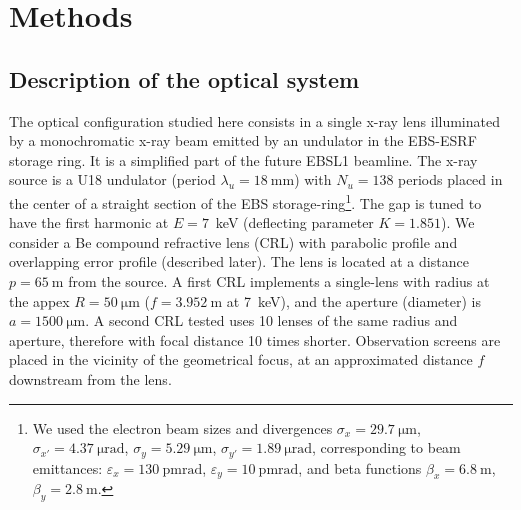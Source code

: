 \documentclass{iucr}
\begin{document}
\section{Methods}\label{sec:methods}

\subsection{Description of the optical system}\label{sec:descriptionsystem}

The optical configuration studied here consists in a single x-ray lens illuminated by a monochromatic x-ray beam emitted by an undulator in the EBS-ESRF storage ring. It is a simplified part of the future EBSL1 beamline.
The x-ray source is a U18 undulator (period $\lambda_u=\SI{18}{\milli\meter}$) with $N_u=138$ periods placed in the center of a straight section of the EBS storage-ring\footnote{We used the electron beam sizes and divergences $\sigma_x=\SI{29.7}{\micro\meter}$,
$\sigma_{x'}=\SI{4.37}{\micro\radian}$,
$\sigma_y=\SI{5.29}{\micro\meter}$,
$\sigma_{y'}=\SI{1.89}{\micro\radian}$, corresponding to beam emittances:  $\varepsilon_x=\SI{130}{\pico\meter \radian}$,
$\varepsilon_y=\SI{10}{\pico\meter \radian}$, and beta functions
$\beta_x=\SI{6.8}{\meter}$,
$\beta_y=\SI{2.8}{\meter}$.
}. The gap is tuned to have the first harmonic at $E=7$~keV (deflecting parameter $K=1.851$). We consider a Be compound refractive lens (CRL) with parabolic profile and overlapping error profile (described later). The lens is located at a distance $p=\SI{65}{\meter}$ from the source. 
A first CRL implements a single-lens with radius at the appex $R=\SI{50}{\micro\meter}$ ($f=\SI{3.952}{\meter}$ at 7~keV), 
 and the aperture (diameter) is $a=\SI{1500}{\micro\meter}$. A second CRL tested uses 10 lenses of the same radius and aperture, therefore with focal distance 10 times shorter.
 Observation screens are placed in the vicinity of the geometrical focus, at an approximated distance $f$ downstream from the lens. 
\end{document}
